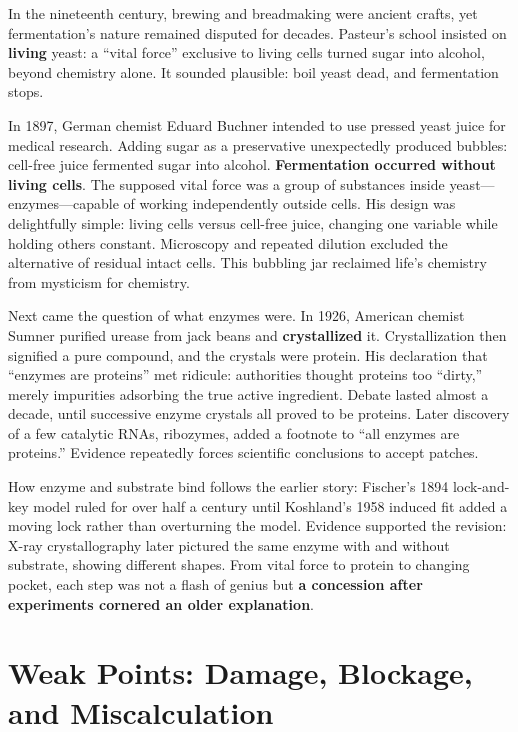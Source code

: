 \begin{zhengju}
In the nineteenth century, brewing and breadmaking were ancient crafts, yet fermentation's nature remained disputed for decades. Pasteur's school insisted on \textbf{living} yeast: a ``vital force'' exclusive to living cells turned sugar into alcohol, beyond chemistry alone. It sounded plausible: boil yeast dead, and fermentation stops.

In 1897, German chemist Eduard Buchner intended to use pressed yeast juice for medical research. Adding sugar as a preservative unexpectedly produced bubbles: cell-free juice fermented sugar into alcohol. \textbf{Fermentation occurred without living cells}. The supposed vital force was a group of substances inside yeast---enzymes---capable of working independently outside cells. His design was delightfully simple: living cells versus cell-free juice, changing one variable while holding others constant. Microscopy and repeated dilution excluded the alternative of residual intact cells. This bubbling jar reclaimed life's chemistry from mysticism for chemistry.

Next came the question of what enzymes were. In 1926, American chemist Sumner purified urease from jack beans and \textbf{crystallized} it. Crystallization then signified a pure compound, and the crystals were protein. His declaration that ``enzymes are proteins'' met ridicule: authorities thought proteins too ``dirty,'' merely impurities adsorbing the true active ingredient. Debate lasted almost a decade, until successive enzyme crystals all proved to be proteins. Later discovery of a few catalytic RNAs, ribozymes, added a footnote to ``all enzymes are proteins.'' Evidence repeatedly forces scientific conclusions to accept patches.

How enzyme and substrate bind follows the earlier story: Fischer's 1894 lock-and-key model ruled for over half a century until Koshland's 1958 induced fit added a moving lock rather than overturning the model. Evidence supported the revision: X-ray crystallography later pictured the same enzyme with and without substrate, showing different shapes. From vital force to protein to changing pocket, each step was not a flash of genius but \textbf{a concession after experiments cornered an older explanation}.
\end{zhengju}

\section{Weak Points: Damage, Blockage, and Miscalculation}

